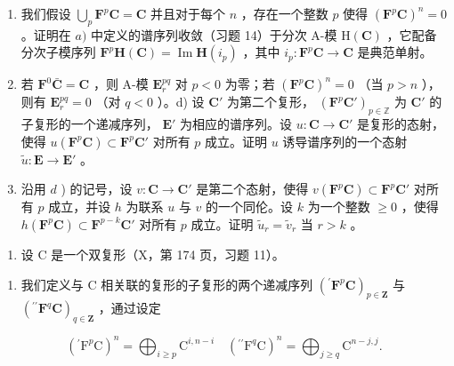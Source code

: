 \begin{enumerate}
\def\labelenumi{\alph{enumi})}
\setcounter{enumi}{1}
\item
  我们假设 \(\bigcup_{p} \mathbf{F}^{p} \mathbf{C} = \mathbf{C}\) 并且对于每个 \(n\) ，存在一个整数 \(p\) 使得 \((\mathbf{F}^{p} \mathbf{C})^{n} = 0\) 。证明在 \(a)\) 中定义的谱序列收敛（习题 14）于分次 A-模 \(\mathrm{H}(\mathbf{C})\) ，它配备分次子模序列 \(\mathbf{F}^{p} \mathbf{H}(\mathbf{C}) = \operatorname{Im} \mathbf{H}(i_{p})\) ，其中 \(i_{p}: \mathbf{F}^{p} \mathbf{C} \to \mathbf{C}\) 是典范单射。
\item
  若 \(\mathbf{F}^0\bar{\mathbf{C}} = \mathbf{C}\) ，则 A-模 \(\mathbf{E}_r^{pq}\) 对 \(p < 0\) 为零；若 \((\mathbf{F}^p\mathbf{C})^n = 0\) （当 \(p > n\) ），则有 \(\mathbf{E}_r^{pq} = 0\) （对 \(q < 0\) ）。d) 设 \(\mathbf{C}'\) 为第二个复形， \((\mathbf{F}^p\mathbf{C}')_{p\in \mathbb{Z}}\) 为 \(\mathbf{C}'\) 的子复形的一个递减序列， \(\mathbf{E}'\) 为相应的谱序列。设 \(u:\mathbf{C}\to \mathbf{C}'\) 是复形的态射，使得 \(u(\mathbf{F}^p\mathbf{C})\subset \mathbf{F}^p\mathbf{C}'\) 对所有 \(p\) 成立。证明 \(u\) 诱导谱序列的一个态射 \(\tilde{u}:\mathbf{E}\to \mathbf{E}'\) 。
\item
  沿用 \(d\) ) 的记号，设 \(v: \mathbf{C} \to \mathbf{C}'\) 是第二个态射，使得 \(v(\mathbf{F}^p \mathbf{C}) \subset \mathbf{F}^p \mathbf{C}'\) 对所有 \(p\) 成立，并设 \(h\) 为联系 \(u\) 与 \(v\) 的一个同伦。设 \(k\) 为一个整数 \(\geqslant 0\) ，使得 \(h(\mathbf{F}^p \mathbf{C}) \subset \mathbf{F}^{p-k} \mathbf{C}'\) 对所有 \(p\) 成立。证明 \(\tilde{u}_r = \tilde{v}_r\) 当 \(r > k\) 。
\end{enumerate}

\begin{enumerate}
\def\labelenumi{\arabic{enumi})}
\setcounter{enumi}{16}
\tightlist
\item
  设 C 是一个双复形（X，第 174 页，习题 11）。
\end{enumerate}

\begin{enumerate}
\def\labelenumi{\alph{enumi})}
\tightlist
\item
  我们定义与 C 相关联的复形的子复形的两个递减序列 \(({}^{\prime}\mathbf{F}^p\mathbf{C})_{p\in \mathbf{Z}}\) 与 \(({}^{\prime\prime}\mathbf{F}^q\mathbf{C})_{q\in \mathbf{Z}}\) ，通过设定
\end{enumerate}

\[
\left(^ {\prime} \mathrm{F} ^ {p} \mathrm{C}\right) ^ {n} = \bigoplus_ {i \geqslant p} \mathrm{C} ^ {i, n - i} \quad \left(^ {\prime \prime} \mathrm{F} ^ {q} \mathrm{C}\right) ^ {n} = \bigoplus_ {j \geqslant q} \mathrm{C} ^ {n - j, j}.
\]

